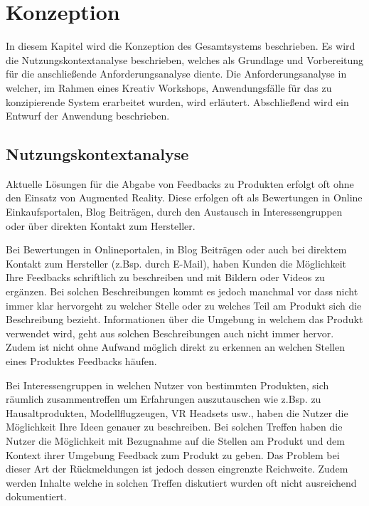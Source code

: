 \chapter{Konzeption}

In diesem Kapitel wird die Konzeption des Gesamtsystems beschrieben. Es wird die Nutzungskontextanalyse beschrieben, welches als Grundlage und Vorbereitung für die anschließende Anforderungsanalyse diente. Die Anforderungsanalyse in welcher, im Rahmen eines Kreativ Workshops, Anwendungsfälle für das zu konzipierende System erarbeitet wurden, wird erläutert. Abschließend wird ein Entwurf der Anwendung beschrieben.

\section{Nutzungskontextanalyse}

Aktuelle Lösungen für die Abgabe von Feedbacks zu Produkten erfolgt oft ohne den Einsatz von Augmented Reality. Diese erfolgen 
oft als Bewertungen in Online Einkaufsportalen, Blog Beiträgen, durch den Austausch in Interessengruppen oder über direkten Kontakt zum Hersteller.

Bei Bewertungen in Onlineportalen, in Blog Beiträgen oder auch bei direktem Kontakt zum Hersteller (z.Bsp. durch E-Mail), haben Kunden die Möglichkeit 
Ihre Feedbacks schriftlich zu beschreiben und mit Bildern oder Videos zu ergänzen. Bei solchen Beschreibungen kommt es jedoch manchmal vor dass 
nicht immer klar hervorgeht zu welcher Stelle oder zu welches Teil am Produkt sich die Beschreibung bezieht. Informationen über die Umgebung in welchem das Produkt 
verwendet wird, geht aus solchen Beschreibungen auch nicht immer hervor. Zudem ist nicht ohne Aufwand möglich direkt zu erkennen an welchen Stellen eines Produktes 
Feedbacks häufen.

Bei Interessengruppen in welchen Nutzer von bestimmten Produkten, sich räumlich zusammentreffen um Erfahrungen auszutauschen wie z.Bsp. zu Hausaltprodukten, Modellflugzeugen, VR Headsets usw., 
haben die Nutzer die Möglichkeit Ihre Ideen genauer zu beschreiben. 
Bei solchen Treffen haben die Nutzer die Möglichkeit mit Bezugnahme auf die Stellen am Produkt und dem Kontext ihrer Umgebung Feedback zum Produkt zu geben. Das Problem bei dieser Art der Rückmeldungen ist jedoch dessen eingrenzte Reichweite. Zudem werden Inhalte welche in solchen Treffen diskutiert wurden oft nicht ausreichend dokumentiert.  

